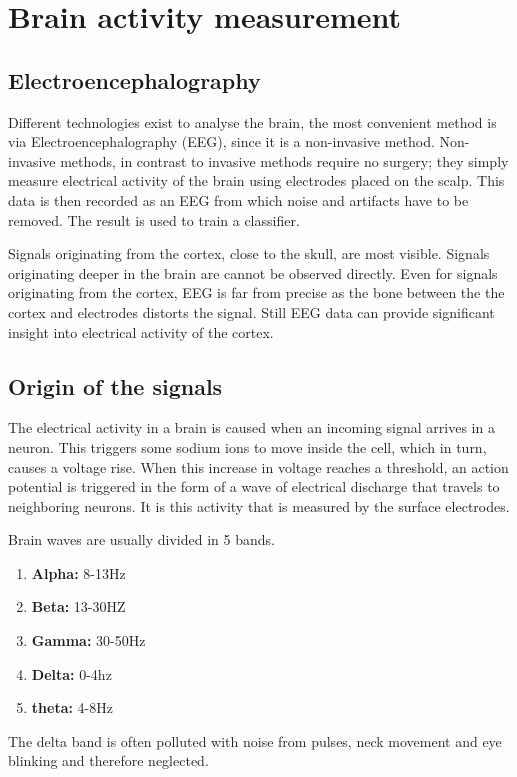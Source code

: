 
\section{Brain activity measurement}

\subsection{Electroencephalography}
Different technologies exist to analyse the brain, the most convenient method is via Electroencephalography (EEG), since it is a non-invasive method. Non-invasive methods, in contrast to invasive methods require no surgery; they simply measure electrical activity of the brain using electrodes placed on the scalp. This data is then recorded as an EEG from which noise and artifacts have to be removed. The result is used to train a classifier. 

\npar

Signals originating from the cortex, close to the skull, are most visible. Signals originating deeper in the brain are cannot be observed directly. Even for signals originating from the cortex, EEG is far from precise as the bone between the the cortex and electrodes distorts the signal. Still EEG data can provide significant insight into electrical activity of the cortex.

\subsection{Origin of the signals}

The electrical activity in a brain is caused when an incoming signal arrives in a neuron. This triggers some sodium ions to move inside the cell, which in turn, causes a voltage rise\cite{ExtendedPaper}. When this increase in voltage reaches a threshold, an action potential is triggered in the form of a wave of electrical discharge that travels to neighboring neurons. It is this activity that is measured by the surface electrodes.

\npar

Brain waves are usually divided in 5 bands\cite{EmotionRelativePower}.
\begin{enumerate}
\item \textbf{Alpha:} 8-13Hz
\item \textbf{Beta:} 13-30HZ
\item \textbf{Gamma:} 30-50Hz
\item \textbf{Delta:} 0-4hz
\item \textbf{theta:} 4-8Hz
\end{enumerate}
The delta band is often polluted with noise from pulses, neck movement and eye blinking and therefore neglected. 


